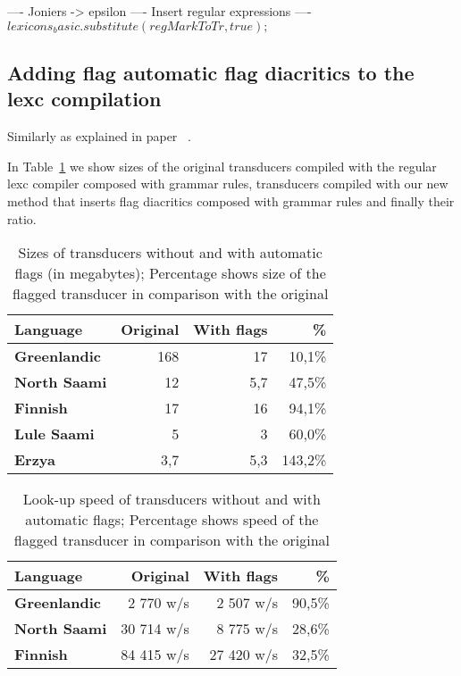 \documentclass[11pt]{article}
\begin{document}
----
Joniers -> epsilon
----
Insert regular expressions
----
$lexicons_basic.substitute(regMarkToTr, true);$




\subsection{Adding flag automatic flag diacritics to the lexc compilation}
Similarly as explained in paper ~\cite{drobac2014}. 





In Table~\ref{table:sizes} we show sizes of the original
transducers compiled with the regular lexc compiler composed with grammar rules, transducers compiled
with our new method that inserts flag diacritics composed with grammar rules and finally their ratio.

\begin{table}
    \centering
    \begin{tabular}{|l|r|r|r|}
        \hline
        \bf Language & \bf Original & \bf With flags & \bf \% \\
        \hline\hline
        \bf Greenlandic &   168   & 17 & 10,1\%  \\
        \bf North Saami &   12     & 5,7 & 47,5\%  \\
        \bf Finnish &   17     & 16 & 94,1\%  \\
        \bf Lule Saami  &   5     & 3 & 60,0\%  \\
        \bf Erzya       &   3,7     & 5,3 & 143,2\%  \\
        \hline
    \end{tabular}
    \caption{Sizes of transducers without and with automatic flags (in megabytes); Percentage shows size of the flagged transducer in comparison with the original
    \label{table:sizes}}
\end{table}


\begin{table}[h]
 \centering
    \begin{tabular}{|l|r|r|r|}
        \hline
        \bf Language & \bf Original & \bf With flags & \bf \% \\
        \hline\hline
        \bf Greenlandic & 2 770 w/s & 2 507 w/s & 90,5\%  \\
        \bf North Saami & 30 714 w/s & 8 775 w/s & 28,6\%  \\
        \bf Finnish  & 84 415 w/s & 27 420 w/s & 32,5\%  \\

        \hline
    \end{tabular}
    \caption{Look-up speed of transducers without and with automatic flags; Percentage shows speed of the flagged transducer in comparison with the original
    \label{table:lookup}}
\end{table}
\end{document}
